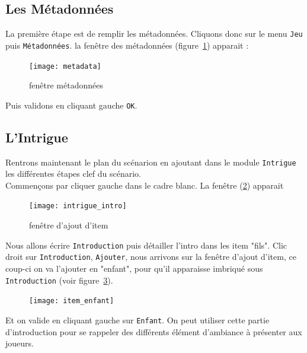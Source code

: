 \documentclass[a4paper,12pt]{article}
\newcommand*{\interfaceitem}[1]{\texttt{#1}}
\begin{document}
\subsection{Les Métadonnées}
La première étape est de remplir les métadonnées. Cliquons donc sur le menu \interfaceitem{Jeu} puis \interfaceitem{Métadonnées}.
la fenêtre des métadonnées (figure~\ref{metadata}) apparait :
\begin{figure}[h!]
    \texttt{[image: metadata]}
    \caption{fenêtre métadonnées}
    \label{metadata}
\end{figure}
Puis validons en cliquant gauche \interfaceitem{OK}.

\subsection{L'Intrigue}
Rentrons maintenant le plan du scénarion en ajoutant dans le module \interfaceitem{Intrigue} les différentes étapes clef du scénario.
\\
Commençons par cliquer gauche dans le cadre blanc. La fenêtre (\ref{intrigue_scenario}) apparait 
\begin{figure}[h!]
    \texttt{[image: intrigue\_intro]}
    \caption{fenêtre d'ajout d'item}
    \label{intrigue_scenario}
\end{figure}
Nous allons écrire \interfaceitem{Introduction} puis détailler l'intro dans les item "fils".
Clic droit sur \interfaceitem{Introduction}, \interfaceitem{Ajouter}, nous arrivons sur la fenêtre d'ajout d'item, ce coup-ci on va l'ajouter en "enfant", pour qu'il apparaisse imbriqué sous \interfaceitem{Introduction} (voir figure~\ref{item_enfant}).
\begin{figure}[h!]
    \texttt{[image: item\_enfant]}
    \label{item_enfant}
\end{figure}
Et on valide en cliquant gauche sur \interfaceitem{Enfant}.
On peut utiliser cette partie d'introduction pour se rappeler des différents élément d'ambiance à présenter aux joueurs.
\end{document}
